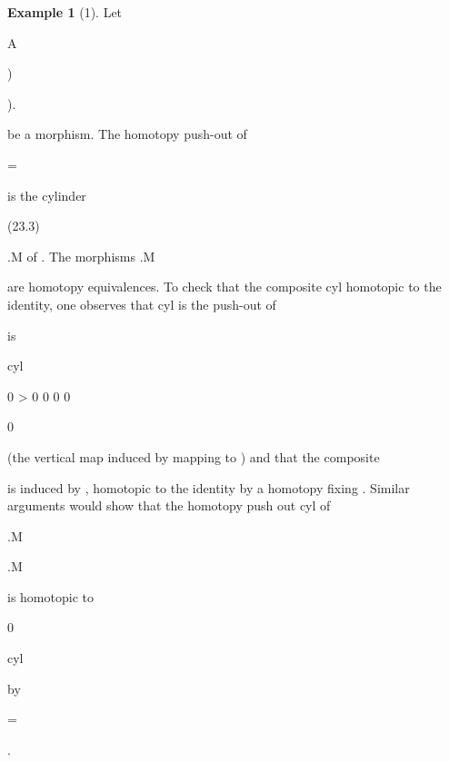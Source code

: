 \documentclass[11pt,a4paper]{article}
\theoremstyle{plain}
\theoremstyle{definition}
\newtheorem{example}[theorem]{Example}
\begin{document}
\begin{example}[1]
Let

A



 )

).

be a morphism. The homotopy push-out of

 


=

is the cylinder

(23.3)

.M  of  . The morphisms
.M 
 

are homotopy equivalences. To check that the composite cyl
homotopic to the identity, one observes that cyl
is the push-out of

 

  is

cyl






0
> 0 0
0 0

0 


(the vertical map induced by
mapping
to ) and that the composite


is induced by
, homotopic to the identity by a
homotopy fixing .
Similar arguments would show that the homotopy push out cyl
of

.M 

.M 


 



is homotopic to

0

cyl

by

 

=


.

\end{example}
\end{document}
